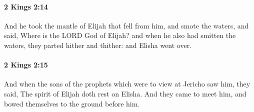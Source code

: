 		\paragraph{2 Kings 2:14} %
			\label{2KINGS-2-14}

			And he took the mantle of Elijah that fell from him, and smote the waters, and said, Where is the LORD God of Elijah? and when he also had smitten the waters, they parted hither and thither: and Elisha went over.


		\paragraph{2 Kings 2:15} %
			\label{2KINGS-2-15}

			And when the sons of the prophets which were to view at Jericho saw him, they said, The spirit of Elijah doth rest on Elisha. And they came to meet him, and bowed themselves to the ground before him.

